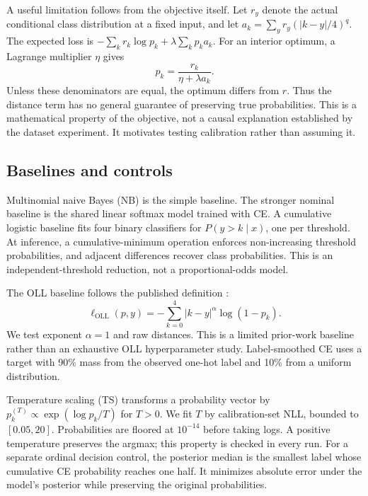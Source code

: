 \documentclass[10pt,twocolumn]{article}
\begin{document}
A useful limitation follows from the objective itself. Let $r_y$ denote the actual conditional class distribution at a fixed input, and let $a_k=\sum_y r_y(|k-y|/4)^q$. The expected loss is $-\sum_k r_k\log p_k+\lambda\sum_k p_ka_k$. For an interior optimum, a Lagrange multiplier $\eta$ gives
\begin{equation}
 p_k=\frac{r_k}{\eta+\lambda a_k}.
 \label{eq:distortion}
\end{equation}
Unless these denominators are equal, the optimum differs from $r$. Thus the distance term has no general guarantee of preserving true probabilities. This is a mathematical property of the objective, not a causal explanation established by the dataset experiment. It motivates testing calibration rather than assuming it.

\subsection{Baselines and controls}
Multinomial naive Bayes (NB) is the simple baseline. The stronger nominal baseline is the shared linear softmax model trained with CE. A cumulative logistic baseline fits four binary classifiers for $P(y>k\mid x)$, one per threshold. At inference, a cumulative-minimum operation enforces non-increasing threshold probabilities, and adjacent differences recover class probabilities. This is an independent-threshold reduction, not a proportional-odds model.

The OLL baseline follows the published definition \cite{castagnos2022}:
\begin{equation}
 \ell_{\mathrm{OLL}}(p,y)=-\sum_{k=0}^{4}|k-y|^\alpha\log(1-p_k).
 \label{eq:oll}
\end{equation}
We test exponent $\alpha=1$ and raw distances. This is a limited prior-work baseline rather than an exhaustive OLL hyperparameter study. Label-smoothed CE uses a target with 90\% mass from the observed one-hot label and 10\% from a uniform distribution.

Temperature scaling (TS) transforms a probability vector by $p_k^{(T)}\propto\exp(\log p_k/T)$ for $T>0$. We fit $T$ by calibration-set NLL, bounded to $[0.05,20]$. Probabilities are floored at $10^{-14}$ before taking logs. A positive temperature preserves the argmax; this property is checked in every run. For a separate ordinal decision control, the posterior median is the smallest label whose cumulative CE probability reaches one half. It minimizes absolute error under the model's posterior while preserving the original probabilities.
\end{document}
